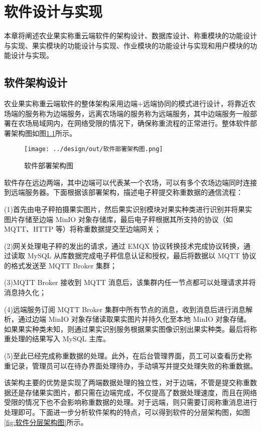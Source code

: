\chapter{软件设计与实现}

本章将阐述农业果实称重云端软件的架构设计、数据库设计、称重模块的功能设计与实现、果实模块的功能设计与实现、作业模块的功能设计与实现和用户模块的功能设计与实现。

\section{软件架构设计}\label{sec:architecture}

农业果实称重云端软件的整体架构采用边端+远端协同的模式进行设计，将靠近农场端的服务称为边端服务，远离农场端的服务称为远端服务，其中边端服务一般部署在农场局域网内，在网络受限的情况下，确保称重流程的正常进行。整体软件部署架构图如图\ref{fig:软件部署架构图}所示。

\begin{figure}
    \centering
    \texttt{[image: ../design/out/软件部署架构图.png]}
    \caption{软件部署架构图}
    \label{fig:软件部署架构图}
\end{figure}

软件存在远边两端，其中边端可以代表某一个农场，可以有多个农场边端同时连接到远端服务器。下面根据该部署架构，描述电子秤提交称重数据的通信流程：

(1)首先由电子秤拍摄果实图片，然后果实识别模块对果实种类进行识别并将果实图片存储至边端 MinIO 对象存储库，最后电子秤根据其所支持的协议（如 MQTT、HTTP 等）将称重数据提交至边端网关；

(2)网关处理电子秤的发出的请求，通过 EMQX 协议转换技术完成协议转换，通过读取 MySQL 从库数据完成电子秤信息认证和授权，最后将数据以 MQTT 协议的格式发送至 MQTT Broker 集群；

(3)MQTT Broker 接收到 MQTT 消息后，该集群内任一节点都可以处理请求并将消息持久化；

(4)远端服务订阅 MQTT Broker 集群中所有节点的消息，收到消息后进行消息解析，通过边端 MinIO 对象存储读取果实图片并持久化至本地 MinIO 对象存储。如果果实种类未知，则通过果实识别服务根据果实图像识别出果实种类。最后将称重处理的结果写入 MySQL 主库。

(5)至此已经完成称重数据的处理。此外，在后台管理界面，员工可以查看历史称重记录，管理员可以在待办界面处理待办，手动填写并提交处理失败的称重数据。

该架构主要的优势是实现了两端数据处理的独立性，对于边端，不管是提交称重数据还是存储果实图片，都只需在边端完成，不仅提高了数据处理速度，而且在网络受限的情况下也不会影响称重数据的处理。对于远端，则只需要订阅称重消息进行处理即可。下面进一步分析软件架构的特点，可以得到软件的分层架构图，如图\ref{fig:软件分层架构图}所示。

